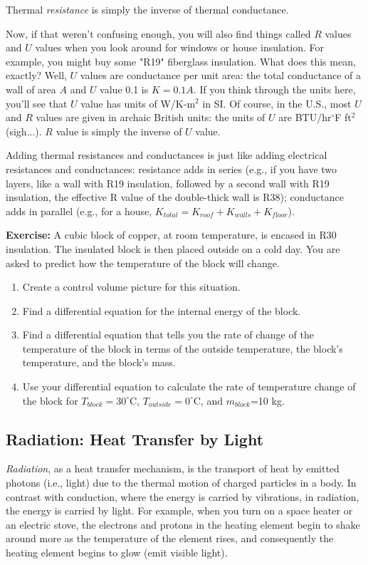 \documentclass[10pt]{book}
\begin{document}
Thermal {\it resistance} is simply the inverse of thermal conductance.  

Now, if that weren't confusing enough, you will also find things called $R$ values and $U$ values when you look around for windows or house insulation.  For example, you might buy some "R19" fiberglass insulation.  What does this mean, exactly?  Well, $U$ values are conductance per unit area:  the total conductance of a wall of area $A$ and $U$ value 0.1 is $K = 0.1 A$.  If you think through the units here, you'll see that $U$ value has units of W/K-m$^2$ in SI.  Of course, in the U.S., most $U$ and $R$ values are given in archaic British units:  the units of $U$ are BTU/hr$^{\circ}$F ft$^2$ (sigh...).  $R$ value is simply the inverse of $U$ value.

Adding thermal resistances and conductances is just like adding electrical resistances and conductances:  resistance adds in series (e.g., if you have two layers, like a wall with R19 insulation, followed by a second wall with R19 insulation, the effective R value of the double-thick wall is R38); conductance adds in parallel (e.g., for a house, $K_{total} = K_{roof} + K_{walls} + K_{floor}$).

{\bf Exercise:}  A cubic block of copper, at room temperature, is encased in R30 insulation.  The insulated block is then placed outside on a cold day.  You are asked to predict how the temperature of the block will change.
\begin{enumerate}
\item Create a control volume picture for this situation.
\item Find a differential equation for the internal energy of the block.
\item Find a differential equation that tells you the rate of change of the temperature of the block in terms of the outside temperature, the block's temperature, and the block's mass. 
\item Use your differential equation to calculate the rate of temperature change of the block for $T_{block} = 30 ^{\circ}$C, $T_{outside}=0  ^{\circ}$C, and $m_{block}$=10 kg. 
\end{enumerate}

 
\subsection{Radiation: Heat Transfer by Light}

{\it Radiation}, as a heat transfer mechanism, is the transport of heat by emitted photons (i.e., light) due to the thermal motion of charged particles in a body.  In contrast with conduction, where the energy is carried by vibrations, in radiation, the energy is carried by light.  For example, when you turn on a space heater or an electric stove, the electrons and protons in the heating element begin to shake around more as the temperature of the element rises, and consequently the heating element begins to glow (emit visible light).
\end{document}
